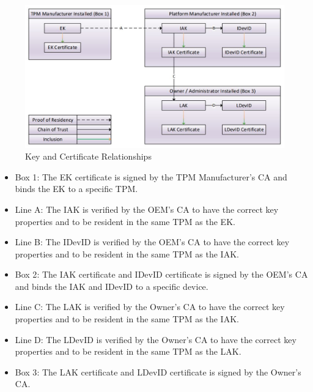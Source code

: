 
 
\begin{figure}[h]
  \begin{centering}
  \includegraphics[width=\linewidth]{chap_3_figures/certificateRelationships.jpg}
  \par\end{centering}
  \caption{Key and Certificate Relationships \cite{DevIDSpec-TCG}}
  \label{fig:cert_rel}
\end{figure}
\begin{itemize}[itemsep=0pt,parsep=0pt,partopsep=0pt]
  \item \textsf{Box 1}: The EK certificate is signed by the TPM Manufacturer's CA and binds the EK to a specific TPM.
  \item \textsf{Line A}: The IAK is verified by the OEM's CA to have the correct key properties and to be resident in the same TPM as the EK.
  \item \textsf{Line B}: The IDevID is verified by the OEM's CA to have the correct key properties and to be resident in the same TPM as the IAK.
  \item \textsf{Box 2}: The IAK certificate and IDevID certificate is signed by the OEM's CA and binds the IAK and IDevID to a specific device.
  \item \textsf{Line C}: The LAK is verified by the Owner's CA to have the correct key properties and to be resident in the same TPM as the IAK.
  \item \textsf{Line D}: The LDevID is verified by the Owner's CA to have the correct key properties and to be resident in the same TPM as the LAK.
  \item \textsf{Box 3}: The LAK certificate and LDevID certificate is signed by the Owner's CA.
\end{itemize}

